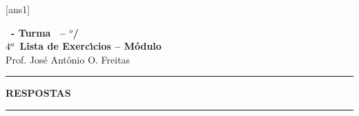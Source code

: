\documentclass[12pt]{exam}
\begin{document}
    [ans1]
    
    \begin{center}
        {\Large\bf \disciplina\ - Turma \turma\ -- \semestre$^{o}$/\ano} \\ \vspace{9pt} {\large\bf
            $4^a$ Lista de Exerc{\'\i}cios -- Módulo \numeromodulo}\\ \vspace{9pt} Prof. Jos{\'e} Ant{\^o}nio O. Freitas
    \end{center}
    
    \hrule

    \newpage
    

    \begin{center}
        {\large\bf RESPOSTAS}
    \end{center}

    \hrule
    
    
\end{document}
